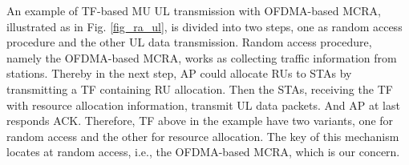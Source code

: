 \documentclass[journal]{IEEEtran}
\begin{document}
An example of TF-based MU UL transmission with OFDMA-based MCRA, illustrated as in Fig. \ref{fig_ra_ul}, is divided into two steps, one as random access procedure and the other UL data transmission.
Random access procedure, namely the OFDMA-based MCRA, works as collecting traffic information from stations.
Thereby in the next step, AP could allocate RUs to STAs by transmitting a TF containing RU allocation.
Then the STAs, receiving the TF with resource allocation information, transmit UL data packets. And AP at last responds ACK.
Therefore, TF above in the example have two variants, one for random access and the other for resource allocation. 
The key of this mechanism locates at random access, i.e., the OFDMA-based MCRA, which is our concern.
\end{document}
